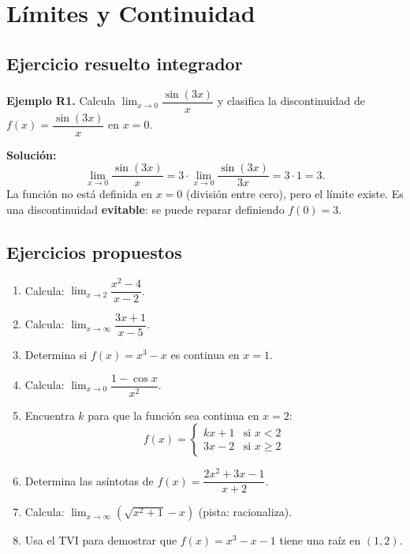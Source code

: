 \documentclass[12pt, a4paper]{article}
\begin{document}
\newpage

\section{Límites y Continuidad}

\subsection{Ejercicio resuelto integrador}

\textbf{Ejemplo R1.} Calcula $\lim_{x \to 0} \dfrac{\sin(3x)}{x}$ y clasifica la discontinuidad de $f(x) = \dfrac{\sin(3x)}{x}$ en $x = 0$.

\begin{cuadrosolucion}
  \textbf{Solución:}
  $$\lim_{x \to 0} \dfrac{\sin(3x)}{x} = 3 \cdot \lim_{x \to 0} \dfrac{\sin(3x)}{3x} = 3 \cdot 1 = 3.$$
  La función no está definida en $x = 0$ (división entre cero), pero el límite existe. Es una discontinuidad \textbf{evitable}: se puede reparar definiendo $f(0) = 3$.
\end{cuadrosolucion}

\subsection{Ejercicios propuestos}

\begin{enumerate}[leftmargin=*, resume]
  \item \facil{} Calcula: $\lim_{x \to 2} \dfrac{x^2 - 4}{x - 2}$.

  \item \facil{} Calcula: $\lim_{x \to \infty} \dfrac{3x + 1}{x - 5}$.

  \item \facil{} Determina si $f(x) = x^3 - x$ es continua en $x = 1$.

  \item \medio{} Calcula: $\lim_{x \to 0} \dfrac{1 - \cos x}{x^2}$.

  \item \medio{} Encuentra $k$ para que la función sea continua en $x = 2$:
        $$f(x) = \begin{cases} kx + 1 & \text{si } x < 2 \\ 3x - 2 & \text{si } x \geq 2 \end{cases}$$

  \item \medio{} Determina las asíntotas de $f(x) = \dfrac{2x^2 + 3x - 1}{x + 2}$.

  \item \dificil{} Calcula: $\lim_{x \to \infty} \left(\sqrt{x^2 + 1} - x\right)$ (pista: racionaliza).

  \item \dificil{} Usa el TVI para demostrar que $f(x) = x^3 - x - 1$ tiene una raíz en $(1, 2)$.
\end{enumerate}
\end{document}
